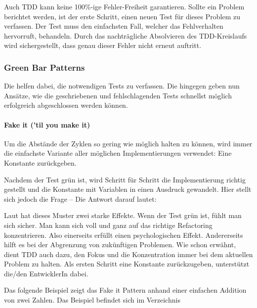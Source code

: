 Auch TDD kann keine 100\%-ige Fehler-Freiheit garantieren. Sollte ein Problem berichtet werden, ist der erste Schritt, einen neuen Test für dieses Problem zu verfassen. Der Test muss den einfachsten Fall, welcher das Fehlverhalten hervorruft, behandeln. Durch das nachträgliche Absolvieren des TDD-Kreislaufs wird sichergestellt, dass genau dieser Fehler nicht erneut auftritt.

\subsubsection{Green Bar Patterns}

Die  helfen dabei, die notwendigen Tests zu verfassen. Die  hingegen geben nun Ansätze, wie die geschriebenen und fehlschlagenden Tests schnellst möglich erfolgreich abgeschlossen werden können.

\paragraph{Fake it ('til you make it)}

Um die Abstände der  Zyklen so gering wie möglich halten zu können, wird immer die einfachste Variante aller möglichen Implementierungen verwendet: Eine Konstante zurückgeben.

Nachdem der Test grün ist, wird Schritt für Schritt die Implementierung richtig gestellt und die Konstante mit Variablen in einen Ausdruck gewandelt. Hier stellt sich jedoch die Frage  -- Die Antwort darauf lautet: 

Laut \cite[152]{Beck:2003} hat dieses Muster zwei starke Effekte. Wenn der Test grün ist, fühlt man sich sicher. Man kann sich voll und ganz auf das richtige Refactoring konzentrieren. Also einerseits erfüllt  einen psychologischen Effekt. Andererseits hilft es bei der Abgrenzung von zukünftigen Problemen. Wie schon erwähnt, dient TDD auch dazu, den Fokus und die Konzentration immer bei dem aktuellen Problem zu halten. Als ersten Schritt eine Konstante zurückzugeben, unterstützt die/den EntwicklerIn dabei.

Das folgende Beispiel zeigt das Fake it Pattern anhand einer einfachen Addition von zwei Zahlen. Das Beispiel befindet sich im Verzeichnis 

